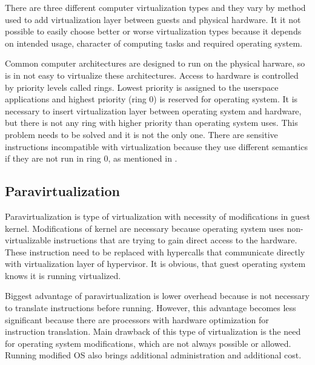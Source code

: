 
There are three different computer virtualization types and they vary by method used to add virtualization layer between guests and physical hardware. It it not possible to easily choose better or worse virtualization types because it depends on intended usage, character of computing tasks and required operating system.
 
Common computer architectures are designed to run on the physical harware, so is in not easy to virtualize these architectures. Access to hardware is controlled by priority levels called rings. Lowest priority is assigned to the userspace applications and highest priority (ring 0) is reserved for operating system. It is necessary to insert virtualization layer between operating system and hardware, but there is not any ring with higher priority than operating system uses. This problem needs to be solved and it is not the only one. There are sensitive instructions incompatible with virtualization because they use different semantics if they are not run in ring 0, as mentioned in \cite{vmware-para}.

\subsection{Paravirtualization}
Paravirtualization is type of virtualization with necessity of modifications in guest kernel. Modifications of kernel are necessary because operating system uses non-virtualizable instructions that are trying to gain direct access to the hardware. These instruction need to be replaced with hypercalls that communicate directly with virtualization layer of hypervisor. \cite{vmware-para} It is obvious, that guest operating system knows it is running virtualized. 

Biggest advantage of paravirtualization is lower overhead because is not necessary to translate instructions before running. However, this advantage becomes less significant because there are processors with hardware optimization for instruction translation. Main drawback of this type of virtualization is the need for operating system modifications, which are not always possible or allowed. Running modified \Ac{OS} also brings additional administration and additional cost.

